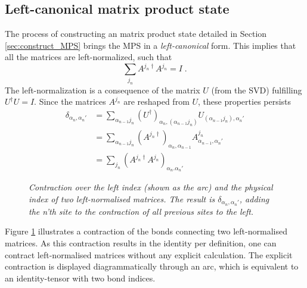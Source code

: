 \subsection{Left-canonical matrix product state}
The process of constructing an matrix product state detailed in Section \ref{sec:construct_MPS} brings the MPS in a \textit{left-canonical} form. This implies that all the matrices are left-normalized, such that
\begin{equation}
	\sum_{j_n} A^{j_n \dag} A^{j_n} = I \; .
	\label{eq:LC_ident}
\end{equation}
The left-normalization is a consequence of the matrix $U$ (from the SVD) fulfilling $U^{\dag}U = I$. Since the matrices $A^{j_n}$ are reshaped from $U$, these properties persists
\begin{align*}
	\delta_{\alpha_n , \alpha_n'} &= \sum_{\alpha_{n-1} j_n} (U^{\dag})_{\alpha_n , (\alpha_{n-1} j_n)} U_{(\alpha_{n-1} j_n), \alpha_n'} \\
	 &= \sum_{\alpha_{n-1} j_n} (A^{j_n \dag})_{\alpha_n , \alpha_{n-1}} A_{\alpha_{n-1}, \alpha_n'}^{j_n} \\
	 &= \sum_{j_n} \left( A^{j_n \dag} A^{j_n} \right)_{\alpha_{n} . \alpha_n'}
\end{align*} 
\begin{figure}[h!]
	\centering
	
	\caption{\textit{Contraction over the left index (shown as the arc) and the physical index of two left-normalised matrices. The result is $\delta_{\alpha_n , \alpha_n'}$, adding the n'th site to the contraction of all previous sites to the left.}}
	\label{fig:leftNorm}
\end{figure}
Figure \ref{fig:leftNorm} illustrates a contraction of the bonds connecting two left-normalised matrices. As this contraction results in the identity per definition, one can contract left-normalised matrices without any explicit calculation. The explicit contraction is displayed diagrammatically through an arc, which is equivalent to an identity-tensor with two bond indices. 


